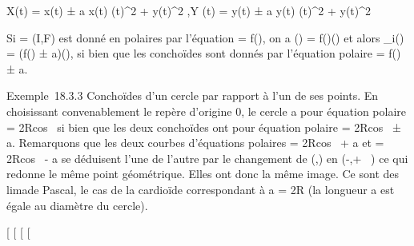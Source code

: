 \documentclass[]{article}
\begin{document}
X(t) = x(t) ± a x(t) \over
\sqrtx(t)^2  + y(t)^2
,\quad Y (t) = y(t) ± a y(t) \over
\sqrtx(t)^2  + y(t)^2

Si \Gamma = (I,F) est donné en polaires par l'équation \rho = f(\theta), on a
\overrightarrowOF(\theta) =
f(\theta)\vecu(\theta) et alors
\overrightarrowOF_i(\theta) = (f(\theta) ±
a)\vecu(\theta), si bien que les conchoïdes sont donnés
par l'équation polaire \rho = f(\theta) ± a.

Exemple~18.3.3 Conchoïdes d'un cercle par rapport à l'un de ses points.
En choisissant convenablement le repère d'origine 0, le cercle a pour
équation polaire \rho = 2Rcos~ \theta si bien que les
deux conchoïdes ont pour équation polaire \rho =
2Rcos~ \theta ± a. Remarquons que les deux courbes
d'équations polaires \rho = 2Rcos~ \theta + a et \rho =
2Rcos~ \theta - a se déduisent l'une de l'autre par
le changement de (\rho,\theta) en (-\rho,\theta + \pi~) ce qui redonne le même point
géométrique. Elles ont donc la même image. Ce sont des
lima\ccons de Pascal, le cas de la cardioïde
correspondant à a = 2R (la longueur a est égale au diamètre du cercle).

[
[
[
[
\end{document}
